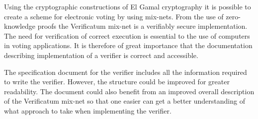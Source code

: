 Using the cryptographic constructions of El Gamal cryptography it is
possible to create a scheme for electronic voting by using
mix-nets. From the use of zero-knowledge proofs the Verificatum
mix-net is a verifiably secure implementation. The need for
verification of correct execution is essential to the use of computers
in voting applications. It is therefore of great importance that the
documentation describing implementation of a verifier is correct and
accessible.

The specification document for the verifier includes all the
information required to write the verifier. However, the structure
could be improved for greater readability. The document could also
benefit from an improved overall description of the Verificatum
mix-net so that one easier can get a better understanding of what
approach to take when implementing the verifier.

\vspace{16pt}
